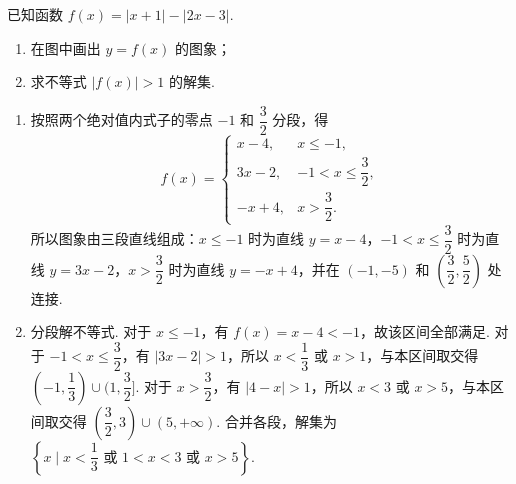 \begin{problem}

已知函数 \(f(x)=|x+1|-|2x-3|\).

\begin{enumerate}
\item 在图中画出 \(y=f(x)\) 的图象；
\item 求不等式 \(|f(x)|>1\) 的解集.
\end{enumerate}

\end{problem}

\begin{solution}
\begin{enumerate}
\item 按照两个绝对值内式子的零点 \(-1\) 和 \(\dfrac32\) 分段，得
\[
f(x)=
\begin{cases}
x-4,&x\le-1,\\
3x-2,&-1<x\le\dfrac32,\\
-x+4,&x>\dfrac32.
\end{cases}
\]
所以图象由三段直线组成：\(x\le-1\) 时为直线 \(y=x-4\)，\(-1<x\le\dfrac32\) 时为直线 \(y=3x-2\)，\(x>\dfrac32\) 时为直线 \(y=-x+4\)，并在 \((-1,-5)\) 和 \(\left(\dfrac32,\dfrac52\right)\) 处连接.
\item 分段解不等式. 对于 \(x\le-1\)，有 \(f(x)=x-4<-1\)，故该区间全部满足. 对于 \(-1<x\le\dfrac32\)，有 \(|3x-2|>1\)，所以 \(x<\dfrac13\) 或 \(x>1\)，与本区间取交得 \((-1,\dfrac13)\cup(1,\dfrac32]\). 对于 \(x>\dfrac32\)，有 \(|4-x|>1\)，所以 \(x<3\) 或 \(x>5\)，与本区间取交得 \((\dfrac32,3)\cup(5,+\infty)\). 合并各段，解集为 \(\left\{x\mid x<\dfrac13\text{ 或 }1<x<3\text{ 或 }x>5\right\}\).
\end{enumerate}
\end{solution}
